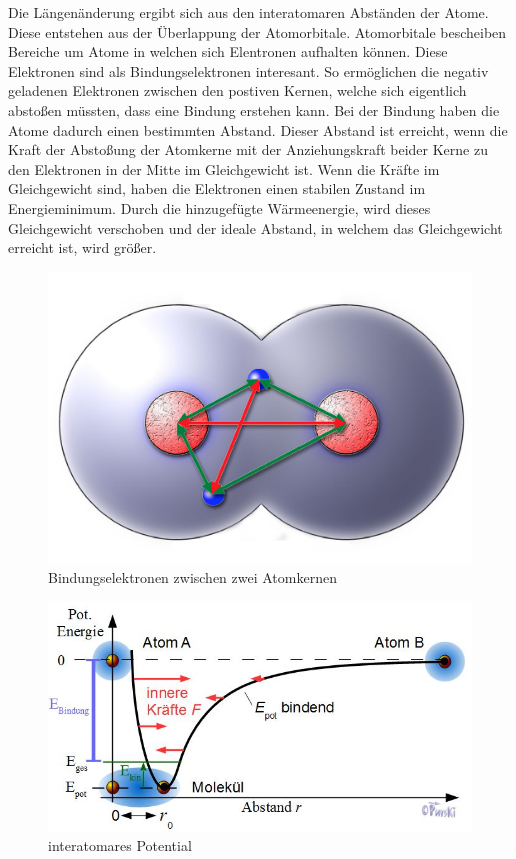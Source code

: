 \documentclass[a4paper]{scrartcl}
\numberwithin{equation}{subsection}
\begin{document}

Die Längenänderung ergibt sich aus den interatomaren Abständen der Atome. Diese entstehen aus der Überlappung der Atomorbitale. Atomorbitale bescheiben Bereiche um Atome in welchen sich Elentronen aufhalten können. Diese Elektronen sind als Bindungselektronen interesant. So ermöglichen die negativ geladenen Elektronen zwischen den postiven Kernen, welche sich eigentlich abstoßen müssten, dass eine Bindung erstehen kann.
Bei der Bindung haben die Atome dadurch einen bestimmten Abstand. Dieser Abstand ist erreicht, wenn die Kraft der Abstoßung der Atomkerne mit der Anziehungskraft beider Kerne zu den Elektronen in der Mitte im Gleichgewicht ist. Wenn die Kräfte im Gleichgewicht sind, haben die Elektronen einen stabilen Zustand im Energieminimum.
Durch die hinzugefügte Wärmeenergie, wird dieses Gleichgewicht verschoben und der ideale Abstand, in welchem das Gleichgewicht erreicht ist, wird größer. \cite{werk}

\begin{figure}[H]
\includegraphics[width=12cm]{Abbildungen/bindungselektronen}
\centering
\caption{Bindungselektronen zwischen zwei Atomkernen \protect\footnotemark}
\centering
\label{fig:bindungselektronen}
\end{figure}


\begin{figure}[H]
\includegraphics[width=12cm]{Abbildungen/bindungsenergie}
\centering
\caption{interatomares Potential \protect\footnotemark}
\centering
\label{fig:bindungsenergie}
\end{figure}
\end{document}
